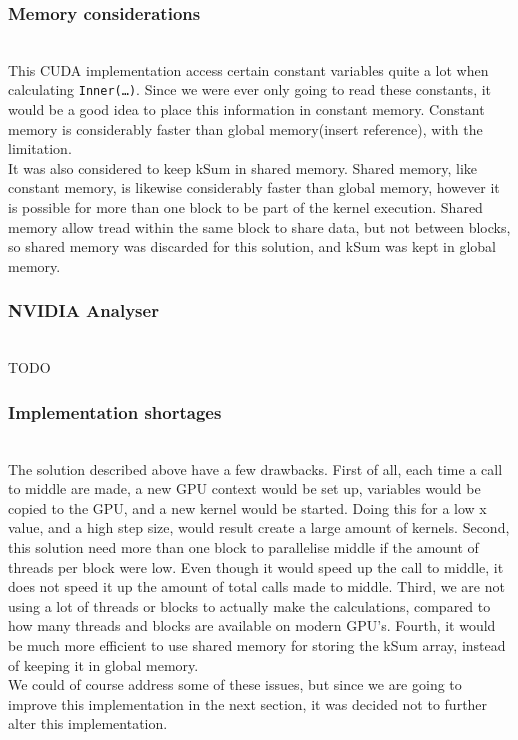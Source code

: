 \subsubsection{Memory considerations} \hfill \\
This CUDA implementation access certain constant variables quite a lot when calculating \texttt{Inner(…)}. Since we were ever only going to read these constants, it would be a good idea to place this information in constant memory. Constant memory is considerably faster than global memory(insert reference), with the limitation.\\

It was also considered to keep kSum in shared memory. Shared memory, like constant memory, is likewise considerably faster than global memory, however it is possible for more than one block to be part of the kernel execution. Shared memory allow tread within the same block to share data, but not between blocks, so shared memory was discarded for this solution, and kSum was kept in global memory.

\subsubsection{NVIDIA Analyser} \hfill \\
TODO

\subsubsection{Implementation shortages} \hfill \\
\label{label:shortages}
The solution described above have a few drawbacks. First of all, each time a call to middle are made, a new GPU context would be set up, variables would be copied to the GPU, and a new kernel would be started. Doing this for a low x value, and a high step size, would result create a large amount of kernels. Second, this solution need more than one block to parallelise middle if the amount of threads per block were low. Even though it would speed up the call to middle, it does not speed it up the amount of total calls made to middle. Third, we are not using a lot of threads or blocks to actually make the calculations, compared to how many threads and blocks are available on modern GPU’s. Fourth, it would be much more efficient to use shared memory for storing the kSum array, instead of keeping it in global memory.\\

We could of course address some of these issues, but since we are going to improve this implementation in the next section, it was decided not to further alter this implementation. \\
